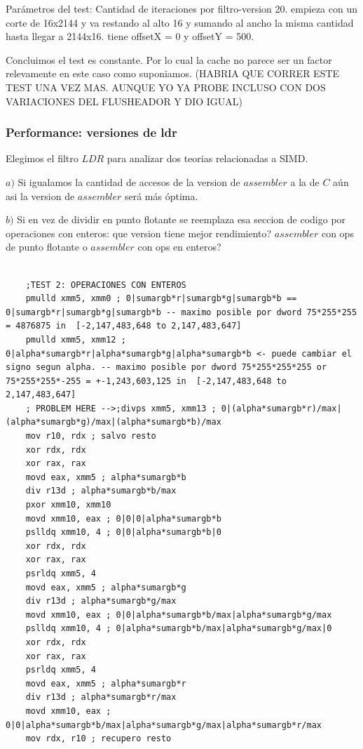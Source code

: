 Parámetros del test: 
Cantidad de iteraciones por filtro-version 20.
empieza con un corte de 16x2144 y va restando al alto 16 y sumando al ancho la misma cantidad hasta llegar a 2144x16. tiene offsetX = 0 y offsetY = 500.

Concluimos el test es constante. Por lo cual la cache no parece ser un factor relevamente en este caso como suponiamos. (HABRIA QUE CORRER ESTE TEST UNA VEZ MAS. AUNQUE YO YA PROBE INCLUSO CON DOS VARIACIONES DEL FLUSHEADOR Y DIO IGUAL)


\subsubsection{Performance: versiones de ldr}

Elegimos el filtro $LDR$ para analizar dos teorias relacionadas a SIMD. 

$a)$ Si igualamos la cantidad de accesos de la version de $assembler$ a la de $C$ aún asi la version de $assembler$ será más óptima.

$b)$ Si en vez de dividir en punto flotante se reemplaza esa seccion de codigo por operaciones con enteros: que version tiene mejor rendimiento? $assembler$ con ops de punto flotante o $assembler$ con ops en enteros?


\begin{codesnippet}
\begin{verbatim}

	;TEST 2: OPERACIONES CON ENTEROS
	pmulld xmm5, xmm0 ; 0|sumargb*r|sumargb*g|sumargb*b == 0|sumargb*r|sumargb*g|sumargb*b -- maximo posible por dword 75*255*255 = 4876875 in  [-2,147,483,648 to 2,147,483,647]
	pmulld xmm5, xmm12 ; 0|alpha*sumargb*r|alpha*sumargb*g|alpha*sumargb*b <- puede cambiar el signo segun alpha. -- maximo posible por dword 75*255*255*255 or 75*255*255*-255 = +-1,243,603,125 in  [-2,147,483,648 to 2,147,483,647]
	; PROBLEM HERE -->;divps xmm5, xmm13 ; 0|(alpha*sumargb*r)/max|(alpha*sumargb*g)/max|(alpha*sumargb*b)/max
    mov r10, rdx ; salvo resto
    xor rdx, rdx
    xor rax, rax
    movd eax, xmm5 ; alpha*sumargb*b
    div r13d ; alpha*sumargb*b/max
    pxor xmm10, xmm10
    movd xmm10, eax ; 0|0|0|alpha*sumargb*b
    pslldq xmm10, 4 ; 0|0|alpha*sumargb*b|0
    xor rdx, rdx
    xor rax, rax
    psrldq xmm5, 4
    movd eax, xmm5 ; alpha*sumargb*g
    div r13d ; alpha*sumargb*g/max
    movd xmm10, eax ; 0|0|alpha*sumargb*b/max|alpha*sumargb*g/max
    pslldq xmm10, 4 ; 0|alpha*sumargb*b/max|alpha*sumargb*g/max|0
    xor rdx, rdx
    xor rax, rax
    psrldq xmm5, 4
    movd eax, xmm5 ; alpha*sumargb*r
    div r13d ; alpha*sumargb*r/max
    movd xmm10, eax ; 0|0|alpha*sumargb*b/max|alpha*sumargb*g/max|alpha*sumargb*r/max
    mov rdx, r10 ; recupero resto
    
\end{verbatim}
\end{codesnippet}

